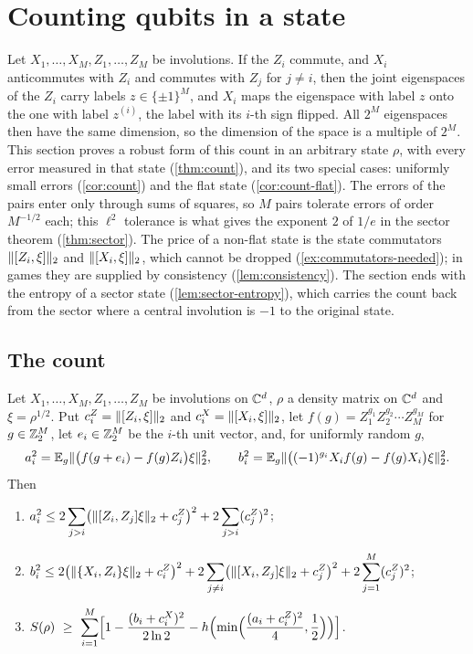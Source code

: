 \section{Counting qubits in a state}\label{sec:count}

Let $X_1,\dots,X_M,Z_1,\dots,Z_M$ be involutions. If the $Z_i$ commute, and $X_i$ anticommutes with $Z_i$ and commutes with $Z_j$ for
$j\ne i$, then the joint eigenspaces of the $Z_i$ carry labels $z\in\{\pm1\}^M$, and $X_i$ maps the eigenspace with label $z$ onto the one
with label $z^{(i)}$, the label with its $i$-th sign flipped. All $2^M$ eigenspaces then have the same dimension, so the dimension of
the space is a multiple of $2^M$. This section proves a robust form of this count in an arbitrary state $\rho$, with every error measured in that state
(\cref{thm:count}), and its two special cases: uniformly small errors (\cref{cor:count}) and the flat state (\cref{cor:count-flat}). The
errors of the pairs enter only through sums of squares, so $M$ pairs tolerate errors of order $M^{-1/2}$ each; this $\ell^2$ tolerance is
what gives the exponent $2$ of $1/e$ in the sector theorem (\cref{thm:sector}). The price of a non-flat state is the state commutators
$\lVert [Z_i,\xi]\rVert_2$ and $\lVert [X_i,\xi]\rVert_2$, which cannot be dropped (\cref{ex:commutators-needed}); in games they are supplied by consistency
(\cref{lem:consistency}). The section ends with the entropy of a sector state (\cref{lem:sector-entropy}), which carries the count back
from the sector where a central involution is $-1$ to the original state.

\subsection{The count}

\begin{theorem}\label{thm:count}
Let $X_1,\dots,X_M,Z_1,\dots,Z_M$ be involutions on $\mathbb C^d$, $\rho$ a density matrix on $\mathbb C^d$ and $\xi=\rho^{1/2}$. Put
$c^Z_i=\lVert [Z_i,\xi]\rVert_2$ and $c^X_i=\lVert [X_i,\xi]\rVert_2$, let $f(g)=Z_1^{g_1}Z_2^{g_2}\cdots Z_M^{g_M}$ for $g\in\mathbb Z_2^M$, let $e_i\in\mathbb Z_2^M$ be the
$i$-th unit vector, and, for uniformly random $g$,
\[
a_i^2=\mathbb E_g\lVert \bigl(f(g+e_i)-f(g)Z_i\bigr)\xi\rVert_2^2,\qquad b_i^2=\mathbb E_g\lVert \bigl((-1)^{g_i}X_if(g)-f(g)X_i\bigr)\xi\rVert_2^2 .
\]
Then
\begin{enumerate}[label=(\roman*),itemsep=2pt]
\item $\displaystyle a_i^2\le2\sum_{j>i}\bigl(\lVert [Z_i,Z_j]\xi\rVert_2+c^Z_j\bigr)^2+2\sum_{j>i}(c^Z_j)^2$;
\item $\displaystyle b_i^2\le2\bigl(\lVert \{X_i,Z_i\}\xi\rVert_2+c^Z_i\bigr)^2+2\sum_{j\ne i}\bigl(\lVert [X_i,Z_j]\xi\rVert_2+c^Z_j\bigr)^2+2\sum_{j=1}^M(c^Z_j)^2$;
\item $\displaystyle S(\rho)\ \ge\ \sum_{i=1}^M\Bigl[1-\frac{(b_i+c^X_i)^2}{2\ln2}-h\Bigl(\min\Bigl(\frac{(a_i+c^Z_i)^2}4,\frac12\Bigr)\Bigr)\Bigr]$.
\end{enumerate}
\end{theorem}

